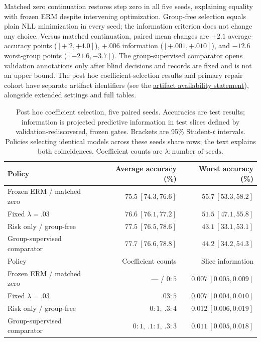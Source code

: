 Matched zero continuation restores step zero in all five seeds, explaining equality with frozen ERM despite intervening optimization. Group-free selection equals plain NLL minimization in every seed; the information criterion does not change any choice. Versus matched continuation, paired mean changes are $+2.1$ average-accuracy points ($[+.2,+4.0]$), $+.006$ information ($[+.001,+.010]$), and $-12.6$ worst-group points ($[-21.6,-3.7]$). The group-supervised comparator opens validation annotations only after blind decisions and records are fixed and is not an upper bound. The post hoc coefficient-selection results and primary repair cohort have separate artifact identifiers (see the \hyperref[sec:artifact-availability]{artifact availability statement}), alongside extended settings and full tables.

\begin{table}[H]
\centering\small
\caption{Post hoc coefficient selection, five paired seeds. Accuracies are test results; information is projected predictive information in test slices defined by validation-rediscovered, frozen gates. Brackets are 95\% Student-$t$ intervals. Policies selecting identical models across these seeds share rows; the text explains both coincidences. Coefficient counts are $\lambda:\text{number of seeds}$.}
\label{tab:e-groupfree-performance}\label{tab:e-groupfree-information}
\begin{tabular}{@{}lrr@{}}
\toprule
Policy & Average accuracy (\%) & Worst accuracy (\%)\\
\midrule
Frozen ERM / matched zero & $75.5\ [74.3,76.6]$ & $55.7\ [53.3,58.2]$\\
Fixed $\lambda=.03$ & $76.6\ [76.1,77.2]$ & $51.5\ [47.1,55.8]$\\
Risk only / group-free & $77.5\ [76.5,78.6]$ & $43.1\ [33.1,53.1]$\\
Group-supervised comparator & $77.7\ [76.6,78.8]$ & $44.2\ [34.2,54.3]$\\
\midrule
Policy & Coefficient counts & Slice information\\
\midrule
Frozen ERM / matched zero & --- / $0:5$ & $0.007\ [0.005,0.009]$\\
Fixed $\lambda=.03$ & $.03:5$ & $0.007\ [0.004,0.010]$\\
Risk only / group-free & $0:1,\ .3:4$ & $0.012\ [0.006,0.019]$\\
Group-supervised comparator & $0:1,\ .1:1,\ .3:3$ & $0.011\ [0.005,0.018]$\\
\bottomrule
\end{tabular}
\end{table}

